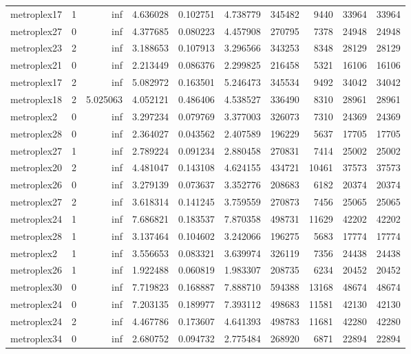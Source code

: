 \begin{longtable}{|l|r|r|r|r|r|r|r|r|r|}
metroplex17 & 1 & inf & 4.636028 & 0.102751 & 4.738779 & 345482 & 9440 & 33964 & 33964 \\
metroplex27 & 0 & inf & 4.377685 & 0.080223 & 4.457908 & 270795 & 7378 & 24948 & 24948 \\
metroplex23 & 2 & inf & 3.188653 & 0.107913 & 3.296566 & 343253 & 8348 & 28129 & 28129 \\
metroplex21 & 0 & inf & 2.213449 & 0.086376 & 2.299825 & 216458 & 5321 & 16106 & 16106 \\
metroplex17 & 2 & inf & 5.082972 & 0.163501 & 5.246473 & 345534 & 9492 & 34042 & 34042 \\
metroplex18 & 2 & 5.025063 & 4.052121 & 0.486406 & 4.538527 & 336490 & 8310 & 28961 & 28961 \\
metroplex2 & 0 & inf & 3.297234 & 0.079769 & 3.377003 & 326073 & 7310 & 24369 & 24369 \\
metroplex28 & 0 & inf & 2.364027 & 0.043562 & 2.407589 & 196229 & 5637 & 17705 & 17705 \\
metroplex27 & 1 & inf & 2.789224 & 0.091234 & 2.880458 & 270831 & 7414 & 25002 & 25002 \\
metroplex20 & 2 & inf & 4.481047 & 0.143108 & 4.624155 & 434721 & 10461 & 37573 & 37573 \\
metroplex26 & 0 & inf & 3.279139 & 0.073637 & 3.352776 & 208683 & 6182 & 20374 & 20374 \\
metroplex27 & 2 & inf & 3.618314 & 0.141245 & 3.759559 & 270873 & 7456 & 25065 & 25065 \\
metroplex24 & 1 & inf & 7.686821 & 0.183537 & 7.870358 & 498731 & 11629 & 42202 & 42202 \\
metroplex28 & 1 & inf & 3.137464 & 0.104602 & 3.242066 & 196275 & 5683 & 17774 & 17774 \\
metroplex2 & 1 & inf & 3.556653 & 0.083321 & 3.639974 & 326119 & 7356 & 24438 & 24438 \\
metroplex26 & 1 & inf & 1.922488 & 0.060819 & 1.983307 & 208735 & 6234 & 20452 & 20452 \\
metroplex30 & 0 & inf & 7.719823 & 0.168887 & 7.888710 & 594388 & 13168 & 48674 & 48674 \\
metroplex24 & 0 & inf & 7.203135 & 0.189977 & 7.393112 & 498683 & 11581 & 42130 & 42130 \\
metroplex24 & 2 & inf & 4.467786 & 0.173607 & 4.641393 & 498783 & 11681 & 42280 & 42280 \\
metroplex34 & 0 & inf & 2.680752 & 0.094732 & 2.775484 & 268920 & 6871 & 22894 & 22894 \\

\end{longtable}
